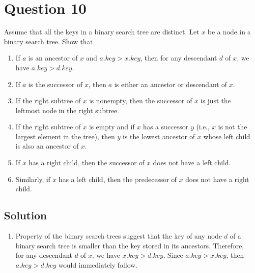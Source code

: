
\section*{Question 10}
Assume that all the keys in a binary search tree are distinct. Let $x$ be a node in a binary search tree. Show that
\begin{enumerate}
\item If $a$ is an ancestor of $x$ and $a.key > x.key$, then for any descendant $d$ of $x$, we have $a.key > d.key$.

\item If $a$ is the successor of $x$, then $a$ is either an ancestor or descendant of $x$.

\item If the right subtree of $x$ is nonempty, then the successor of $x$ is just the leftmost node in the right subtree.

\item If the right subtree of $x$ is empty and if $x$ has a successor $y$ (i.e., $x$ is not the largest element in the tree), then $y$ is the lowest ancestor of $x$ whose left child is also an ancestor of $x$.

\item If $x$ has a right child, then the successor of $x$ does not have a left child.

\item Similarly, if $x$ has a left child, then the predecessor of $x$ does not have a right child.
\end{enumerate}
\subsection*{Solution}
\begin{enumerate}
\item Property of the binary search trees suggest that the key of any node $d$ of a binary search tree is smaller than the key stored in its ancestors. Therefore, for any descendant $d$ of $x$, we have $x.key > d.key$. Since $a.key > x.key$, then $a.key > d.key$ would immediately follow.
\end{enumerate}
